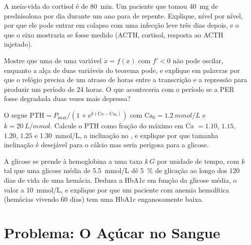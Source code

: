 \begin{exercise}[$\star\star$]\label{exo:b3:endocrinology:9}
A meia-vida do cortisol é de \qty{80}{min}. Um paciente que tomou
\qty{40}{mg} de prednisolona por dia durante um ano para de repente.
Explique, nível por nível, por que ele pode entrar em colapso com uma
infecção leve três dias depois, e o que o eixo mostraria se fosse medido
(ACTH, cortisol, resposta ao ACTH injetado).
\end{exercise}

\begin{exercise}[$\star\star\star$]\label{exo:b3:endocrinology:10}
Mostre que uma  de uma variável $\dot x = f(x)$
com $f' < 0$ não pode oscilar, enquanto a alça de duas variáveis do
teorema pode, e explique em palavras por que o relógio precisa de um
atraso de horas entre a transcrição e a repressão para produzir um
período de 24 horas. O que aconteceria com o período se a PER fosse
degradada duas vezes mais depressa?
\end{exercise}

\begin{exercise}[$\star\star\star$]\label{exo:b3:endocrinology:11}
O  segue $\text{PTH} = P_{\max}/(1 +
\mathrm{e}^{k(\text{Ca} - \text{Ca}_{0})})$ com $\text{Ca}_{0} =
\qty{1.2}{mmol/L}$ e $k = \qty{20}{L/mmol}$. Calcule o PTH como fração do
máximo em Ca $= 1.10$, $1.15$, $1.20$, $1.25$ e \qty{1.30}{mmol/L}, a
inclinação no , e explique por que tamanha inclinação é
desejável para o cálcio mas seria perigosa para a glicose.
\end{exercise}

\begin{exercise}[$\star\star\star$]\label{exo:b3:endocrinology:12}
A glicose se prende à hemoglobina a uma taxa $k\,G$ por unidade de
tempo, com $k$ tal que uma glicose média de \qty{5.5}{mmol/L} dê
\qty{5}{\%} de glicação ao longo dos 120 dias de vida de uma hemácia.
Deduza a HbA1c em função da glicose média, o valor a \qty{10}{mmol/L}, e
explique por que um paciente com anemia hemolítica (hemácias vivendo 60
dias) tem uma HbA1c enganosamente baixa.
\end{exercise}

\section{Problema: O Açúcar no Sangue}

